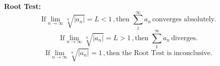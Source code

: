 \documentclass[11pt]{article}
\begin{document}
{\bf Root Test:}  \\
  \begin{displaymath}
\mbox{If} \lim_{n\to \infty}\sqrt[n]{|a_n|} = L < 1 \,, \mbox{then } \sum_1^{\infty}a_n \, \mbox{converges absolutely.}
  \end{displaymath}
    \begin{displaymath}
\mbox{If} \lim_{n\to \infty}\sqrt[n]{|a_n|} = L > 1 \,, \mbox{then } \sum_1^{\infty}a_n \, \mbox{diverges.}
      \end{displaymath}
  \begin{displaymath}
\mbox{If} \lim_{n\to \infty}\sqrt[n]{|a_n|} = 1 \,, \mbox{then the Root Test is inconclusive.}
      \end{displaymath}
\end{document}
